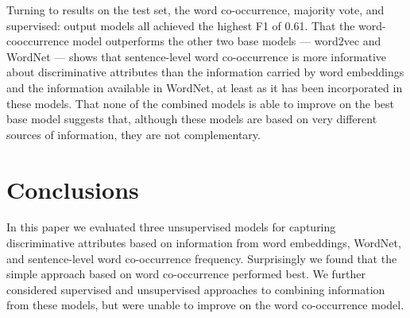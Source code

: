 \documentclass[11pt,a4paper]{article}
\begin{document}
Turning to results on the test set, the word co-occurrence, majority
vote, and supervised: output models all achieved the highest F1 of
0.61. That the word-cooccurrence model outperforms the other two base
models --- word2vec and WordNet --- shows that sentence-level word
co-occurrence is more informative about discriminative attributes than
the information carried by word embeddings and the information
available in WordNet, at least as it has been incorporated in these
models. That none of the combined models is able to improve on the
best base model suggests that, although these models are based on very
different sources of information, they are not complementary.

\section{Conclusions}



In this paper we evaluated three unsupervised models for capturing
discriminative attributes based on information from word embeddings,
WordNet, and sentence-level word co-occurrence frequency. Surprisingly
we found that the simple approach based on word co-occurrence
performed best. We further considered supervised and unsupervised
approaches to combining information from these models, but were unable
to improve on the word co-occurrence model.

\end{document}
